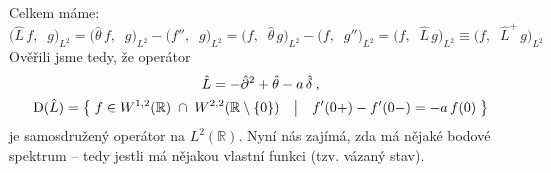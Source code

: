 \documentclass{article}
\newcommand{\R}{\mathbb{R}}
\begin{document}
\medskip\pagebreak

\noindent
Celkem máme:
\begin{equation*}
    \big( \hat L \, f, \;\; g \big)_{L^2}
    = \big( \hat\theta \, f, \;\; g \big)_{L^2}
    - \big( f'' \!, \;\; g \big)_{L^2}
    = \big( f, \;\; \hat\theta \, g \big)_{L^2}
    - \big( f \!, \;\; g'' \big)_{L^2}
    = \big( f, \;\; \hat L \, g \big)_{L^2}
    \equiv \big( f, \;\; \hat L^+ \, g \big)_{L^2}
\end{equation*}
Ověřili jsme tedy, že operátor
\begin{gather*}
    \hat L = - \hat\partial^2 + \hat\theta - a \, \hat\delta \: ,
    \\
    {\rm D}(\hat L) = 
    \big\{\;
        f \in W^{1,2}(\R) \;\cap\; W^{2,2}(\R \setminus \{0\})
    \quad\big|\quad
        f'(0+) - f'(0-) = -a \, f(0)
    \;\big\}
\end{gather*}
je samosdružený operátor na $L^2(\R)$. Nyní nás zajímá, zda má nějaké bodové spektrum – tedy jestli má nějakou vlastní funkci (tzv. vázaný stav).
\end{document}
